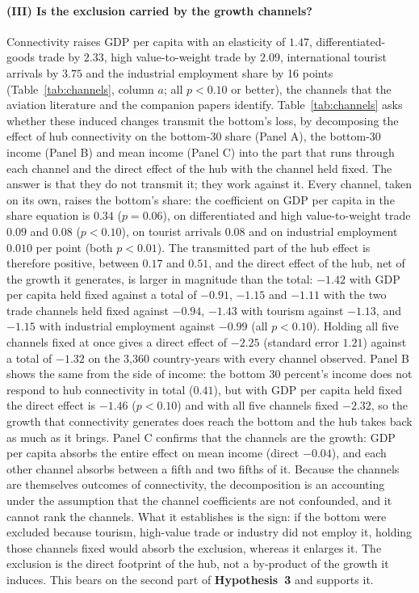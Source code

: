 \paragraph{(III) Is the exclusion carried by the growth channels?}
Connectivity raises GDP per capita with an elasticity of $1.47$, differentiated-goods trade by $2.33$, high value-to-weight trade by $2.09$, international tourist arrivals by $3.75$ and the industrial employment share by 16 points (Table~\ref{tab:channels}, column $a$; all $p<0.10$ or better), the channels that the aviation literature and the companion papers identify. Table~\ref{tab:channels} asks whether these induced changes transmit the bottom's loss, by decomposing the effect of hub connectivity on the bottom-30 share (Panel A), the bottom-30 income (Panel B) and mean income (Panel C) into the part that runs through each channel and the direct effect of the hub with the channel held fixed. The answer is that they do not transmit it; they work against it. Every channel, taken on its own, raises the bottom's share: the coefficient on GDP per capita in the share equation is $0.34$ ($p=0.06$), on differentiated and high value-to-weight trade $0.09$ and $0.08$ ($p<0.10$), on tourist arrivals $0.08$ and on industrial employment $0.010$ per point (both $p<0.01$). The transmitted part of the hub effect is therefore positive, between $0.17$ and $0.51$, and the direct effect of the hub, net of the growth it generates, is larger in magnitude than the total: $-1.42$ with GDP per capita held fixed against a total of $-0.91$, $-1.15$ and $-1.11$ with the two trade channels held fixed against $-0.94$, $-1.43$ with tourism against $-1.13$, and $-1.15$ with industrial employment against $-0.99$ (all $p<0.10$). Holding all five channels fixed at once gives a direct effect of $-2.25$ (standard error $1.21$) against a total of $-1.32$ on the 3{,}360 country-years with every channel observed. Panel B shows the same from the side of income: the bottom 30 percent's income does not respond to hub connectivity in total ($0.41$), but with GDP per capita held fixed the direct effect is $-1.46$ ($p<0.10$) and with all five channels fixed $-2.32$, so the growth that connectivity generates does reach the bottom and the hub takes back as much as it brings. Panel C confirms that the channels are the growth: GDP per capita absorbs the entire effect on mean income (direct $-0.04$), and each other channel absorbs between a fifth and two fifths of it. Because the channels are themselves outcomes of connectivity, the decomposition is an accounting under the assumption that the channel coefficients are not confounded, and it cannot rank the channels. What it establishes is the sign: if the bottom were excluded because tourism, high-value trade or industry did not employ it, holding those channels fixed would absorb the exclusion, whereas it enlarges it. The exclusion is the direct footprint of the hub, not a by-product of the growth it induces. This bears on the second part of \textbf{Hypothesis~3} and supports it.

